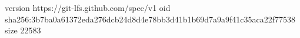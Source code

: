version https://git-lfs.github.com/spec/v1
oid sha256:3b7ba0a61372eda276dcb24d8d4e78bb3d41b1b69d7a9a9f41c35aca22f77538
size 22583
